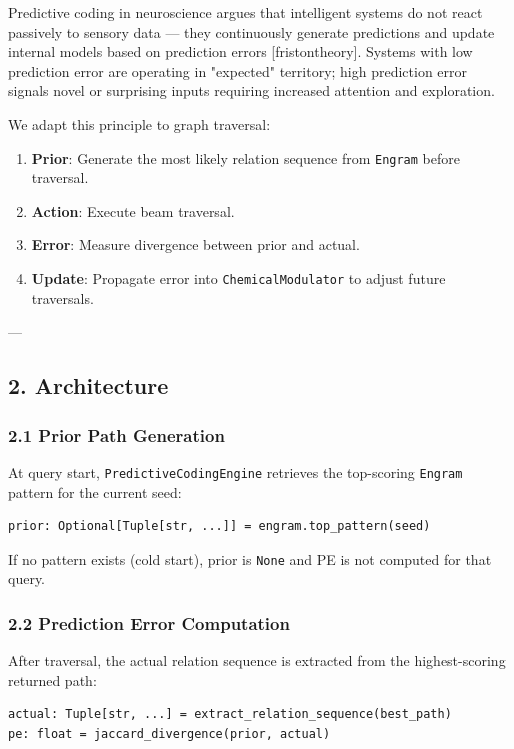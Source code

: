 Predictive coding in neuro\-science argues that intelligent systems do not react passively to sensory data — they conti\-nuously generate predictions and update internal models based on prediction errors [friston\-theory]. Systems with low prediction error are operating in "expected" territory; high prediction error signals novel or surprising inputs requiring increased attention and exploration.

We adapt this principle to graph traversal:
\begin{enumerate}
\item \textbf{Prior}: Generate the most likely relation sequence from \texttt{Engram} before traversal.
\item \textbf{Action}: Execute beam traversal.
\item \textbf{Error}: Measure divergence between prior and actual.
\item \textbf{Update}: Propagate error into \texttt{ChemicalModulator} to adjust future traversals.

\end{enumerate}
---

\subsection{2. Archit\-ecture}

\subsubsection{2.1 Prior Path Generation}

At query start, \texttt{PredictiveCodingEngine} retrieves the top-scoring \texttt{Engram} pattern for the current seed:

\begin{lstlisting}
prior: Optional[Tuple[str, ...]] = engram.top_pattern(seed)
\end{lstlisting}

If no pattern exists (cold start), prior is \texttt{None} and PE is not computed for that query.

\subsubsection{2.2 Prediction Error Computation}

After traversal, the actual relation sequence is extracted from the highest-scoring returned path:

\begin{lstlisting}
actual: Tuple[str, ...] = extract_relation_sequence(best_path)
pe: float = jaccard_divergence(prior, actual)
\end{lstlisting}

